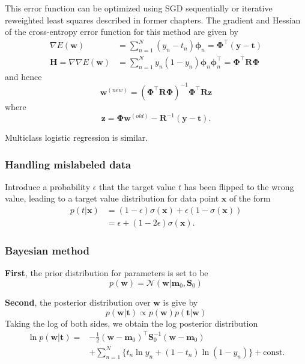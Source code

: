 \documentclass[a4paper]{report}
\newcommand{\up}{\mathrm}
\renewcommand{\bf}{\mathbf}
\renewcommand{\cal}{\mathcal}
\newcommand{\bs}{\boldsymbol}
\begin{document}
This error function can be optimized using SGD sequentially or iterative reweighted least squares described in former chapters. The gradient and Hessian of the cross-entropy error function for this method are given by
\begin{align}
	\nabla E(\bf{w}) &= \sum_{n=1}^N (y_n -t_n) \bs{\phi}_n = \bs{\Phi}^{\intercal} (\bf{y-t})\\
	\bf{H} = \nabla\nabla E(\bf{w}) &= \sum_{n=1} ^N  y_n(1-y_n)\bs{\phi}_n\bs{\phi}_n^{\intercal} = \bs{\Phi}^{\intercal}\bf{R} \bs{\Phi}
\end{align}
and hence
\begin{equation}
	\bf{w}^{(new)} = (\bs{\Phi}^{\intercal} \bf{R} \bs{\Phi})^{-1} \bs{\Phi}^{\intercal} \bf{Rz}	
\end{equation}
where
\begin{equation}
	\bf{z} = \bs{\Phi} \bf{w}^{(old)} - \bf{R}^{-1}(\bf{y-t}).
\end{equation}

Multiclass logistic regression is similar.

\subsubsection{Handling mislabeled data}
Introduce a probability $\epsilon$ that the target value $t$ has been flipped to the wrong value, leading to a target value distribution for data point $\bf{x}$ of the form
\begin{align}
	p(t|\bf{x}) &= (1-\epsilon) \sigma(\bf{x}) + \epsilon(1-\sigma(\bf{x})) \\
	&= \epsilon + (1-2\epsilon) \sigma(\bf{x}).
\end{align}
\subsubsection{Bayesian method}
\textbf{First}, the prior distribution for parameters is set to be
\begin{equation}
	p(\bf{w}) = \cal{N}(\bf{w}|\bf{m}_0,\bf{S}_0)
\end{equation}

\textbf{Second}, the posterior distribution over $\bf{w}$ is give by
\begin{equation}
	p(\bf{w|t}) \propto p(\bf{w}) p(\bf{t|w})
\end{equation}
Taking the log of both sides, we obtain the log posterior distribution
\begin{align}
	\ln p(\bf{w|t}) = &-\frac{1}{2} (\bf{w-m}_0)^{\intercal} \bf{S}_0^{-1} (\bf{w-m}_0) \\
	&+ \sum_{n=1}^N \{ t_n \ln y_n + (1-t_n)\ln (1-y_n) \} + \up{const.}
\end{align}
\end{document}
